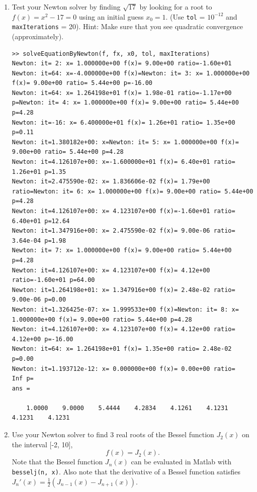 \documentclass[10pt,letterpaper]{article}
\begin{document}
\begin{enumerate}
\color{TangGreen}

\color{black}

\item Test your Newton solver by finding $\sqrt{17}$ by looking for a root to $f(x) = x^{2} - 17 = 0$ using an initial guess $x_{0} = 1$. (Use {\tt tol} = $10^{-12}$ and {\tt maxIterations} = 20). Hint: Make sure that you see quadratic convergence (approximately). 

\color{TangGreen}
\begin{lstlisting}
>> solveEquationByNewton(f, fx, x0, tol, maxIterations)
Newton: it= 2: x= 1.000000e+00 f(x)= 9.00e+00 ratio=-1.60e+01
Newton: it=64: x=-4.000000e+00 f(x)=Newton: it= 3: x= 1.000000e+00 f(x)= 9.00e+00 ratio= 5.44e+00 p=-16.00
Newton: it=64: x= 1.264198e+01 f(x)= 1.98e-01 ratio=-1.17e+00 p=Newton: it= 4: x= 1.000000e+00 f(x)= 9.00e+00 ratio= 5.44e+00 p=4.28
Newton: it=-16: x= 6.400000e+01 f(x)= 1.26e+01 ratio= 1.35e+00 p=0.11
Newton: it=1.380182e+00: x=Newton: it= 5: x= 1.000000e+00 f(x)= 9.00e+00 ratio= 5.44e+00 p=4.28
Newton: it=4.126107e+00: x=-1.600000e+01 f(x)= 6.40e+01 ratio= 1.26e+01 p=1.35
Newton: it=2.475590e-02: x= 1.836606e-02 f(x)= 1.79e+00 ratio=Newton: it= 6: x= 1.000000e+00 f(x)= 9.00e+00 ratio= 5.44e+00 p=4.28
Newton: it=4.126107e+00: x= 4.123107e+00 f(x)=-1.60e+01 ratio= 6.40e+01 p=12.64
Newton: it=1.347916e+00: x= 2.475590e-02 f(x)= 9.00e-06 ratio= 3.64e-04 p=1.98
Newton: it= 7: x= 1.000000e+00 f(x)= 9.00e+00 ratio= 5.44e+00 p=4.28
Newton: it=4.126107e+00: x= 4.123107e+00 f(x)= 4.12e+00 ratio=-1.60e+01 p=64.00
Newton: it=1.264198e+01: x= 1.347916e+00 f(x)= 2.48e-02 ratio= 9.00e-06 p=0.00
Newton: it=1.326425e-07: x= 1.999533e+00 f(x)=Newton: it= 8: x= 1.000000e+00 f(x)= 9.00e+00 ratio= 5.44e+00 p=4.28
Newton: it=4.126107e+00: x= 4.123107e+00 f(x)= 4.12e+00 ratio= 4.12e+00 p=-16.00
Newton: it=64: x= 1.264198e+01 f(x)= 1.35e+00 ratio= 2.48e-02 p=0.00
Newton: it=1.193712e-12: x= 0.000000e+00 f(x)= 0.00e+00 ratio=      Inf p=
ans =

    1.0000    9.0000    5.4444    4.2834    4.1261    4.1231    4.1231    4.1231
\end{lstlisting}
\color{black}

\item Use your Newton solver to find 3 real roots of the Bessel function $J_{2}(x)$ on the interval [-2, 10],
$$f(x) = J_{2}(x).$$
Note that the Bessel function $J_{n}(x)$ can be evaluated in Matlab with {\tt besselj(n, x)}. Also note that the derivative of a Bessel function satisfies $J_{n}'(x) = \frac{1}{2} (J_{n - 1}(x) - J_{n + 1}(x))$. 


\end{enumerate}
\end{document}
